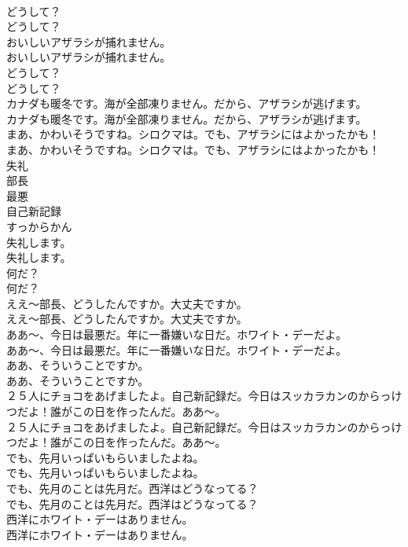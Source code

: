 \documentclass[8pt]{extreport}
\begin{document}
\begin{CJK}{UTF8}{min}
\\	どうして？	
\\	どうして？ 
\\	おいしいアザラシが捕れません。	
\\	おいしいアザラシが捕れません。 
\\	どうして？	
\\	どうして？ 
\\	カナダも暖冬です。海が全部凍りません。だから、アザラシが逃げます。	
\\	カナダも暖冬です。海が全部凍りません。だから、アザラシが逃げます。 
\\	まあ、かわいそうですね。シロクマは。でも、アザラシにはよかったかも！	
\\	まあ、かわいそうですね。シロクマは。でも、アザラシにはよかったかも！ 
\\	失礼
\\	部長
\\	最悪
\\	自己新記録
\\	すっからかん
\\	失礼します。	
\\	失礼します。 
\\	何だ？	
\\	何だ？ 
\\	ええ〜部長、どうしたんですか。大丈夫ですか。	
\\	ええ〜部長、どうしたんですか。大丈夫ですか。 
\\	ああ〜、今日は最悪だ。年に一番嫌いな日だ。ホワイト・デーだよ。	
\\	ああ〜、今日は最悪だ。年に一番嫌いな日だ。ホワイト・デーだよ。 
\\	ああ、そういうことですか。	
\\	ああ、そういうことですか。 
\\	２５人にチョコをあげましたよ。自己新記録だ。今日はスッカラカンのからっけつだよ！誰がこの日を作ったんだ。ああ〜。	
\\	２５人にチョコをあげましたよ。自己新記録だ。今日はスッカラカンのからっけつだよ！誰がこの日を作ったんだ。ああ〜。 
\\	でも、先月いっぱいもらいましたよね。	
\\	でも、先月いっぱいもらいましたよね。 
\\	でも、先月のことは先月だ。西洋はどうなってる？	
\\	でも、先月のことは先月だ。西洋はどうなってる？ 
\\	西洋にホワイト・デーはありません。	
\\	西洋にホワイト・デーはありません。 

\end{CJK}
\end{document}
